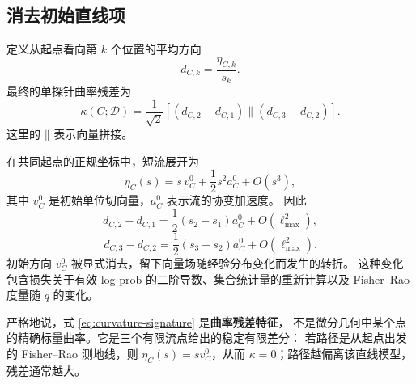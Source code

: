 \documentclass[UTF8,11pt]{ctexart}
\newcommand{\concat}{\mathbin{\|}}
\begin{document}
\subsection{消去初始直线项}

定义从起点看向第 \(k\) 个位置的平均方向
\[
    d_{C,k}
    =
    \frac{\eta_{C,k}}{s_k}.
\]
最终的单探针曲率残差为
\[
    \kappa(C;\mathcal D)
    =
    \frac1{\sqrt2}
    \left[
    \left(d_{C,2}-d_{C,1}\right)
    \concat
    \left(d_{C,3}-d_{C,2}\right)
    \right].
    \label{eq:curvature-signature}
\]
这里的 \(\concat\) 表示向量拼接。

在共同起点的正规坐标中，短流展开为
\[
    \eta_C(s)
    =
    s\,v_C^0
    +
    \frac12s^2a_C^0
    +
    O(s^3),
    \label{eq:flow-taylor}
\]
其中 \(v_C^0\) 是初始单位切向量，\(a_C^0\) 表示流的协变加速度。
因此
\[
    d_{C,2}-d_{C,1}
    =
    \frac12(s_2-s_1)a_C^0+O(\ell_{\max}^2),
\]
\[
    d_{C,3}-d_{C,2}
    =
    \frac12(s_3-s_2)a_C^0+O(\ell_{\max}^2).
\]
初始方向 \(v_C^0\) 被显式消去，留下向量场随经验分布变化而发生的转折。
这种变化包含损失关于有效 log-prob 的二阶导数、集合统计量的重新计算以及
Fisher--Rao 度量随 \(q\) 的变化。

严格地说，式 \eqref{eq:curvature-signature} 是\textbf{曲率残差特征}，
不是微分几何中某个点的精确标量曲率。它是三个有限流点给出的稳定有限差分：
若路径是从起点出发的 Fisher--Rao 测地线，则
\(\eta_C(s)=sv_C^0\)，从而 \(\kappa=0\)；路径越偏离该直线模型，
残差通常越大。
\end{document}

